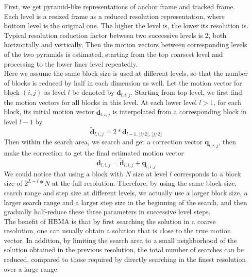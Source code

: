 \documentclass[a4paper, twocolumn]{article}
\begin{document}
	\noindent
	First, we get pyramid-like representations of anchor frame and tracked frame. Each level is a resized frame as  a reduced resolution representation, where bottom level is the original one. The higher the level is, the lower its resolution is. Typical resolution reduction factor between two successive levels is 2, both horizontally and vertically. Then the motion vectors between corresponding levels of the two pyramids is estimated, starting from the top coarsest level and processing to the lower finer level repeatedly.\\
	Here we assume the same block size is used at different levels, so that the number of blocks is reduced by half in each dimension as well. Let the motion vector for block $ (i, j) $ as level $ l $ be denoted by $ \textbf{d}_{l, i, j} $. Starting from top level, we first find the motion vectors for all blocks in this level. At each lower level $ l > 1 $, for each block, its initial motion vector $ \widetilde{\textbf{d}}_{l, i, j} $ is interpolated from a corresponding block in level $ l - 1 $ by 
	\begin{displaymath}
		\widetilde{\textbf{d}}_{l, i, j} = 2*\textbf{d}_{l-1, \lfloor i/2 \rfloor, \lfloor j/2 \rfloor}
	\end{displaymath}
	Then within the search area, we search and get a correction vector $ \textbf{q}_{l, i, j} $, then make the correction to get the final estimated motion vector
	\begin{displaymath}
		\textbf{d}_{l, i, j} = \widetilde{\textbf{d}}_{l, i, j} + \textbf{q}_{l, i, j}
	\end{displaymath}
	We could notice that using a block with $ N $ size at level $ l $ corresponds to a block size of $ 2^{L-l} * N$ at the full resolution. Therefore, by using the same block size, search range and step size at different levels, we actually use a larger block size, a larger search range and a larger step size in the beginning of the search, and then gradually half-reduce these three parameters in successive level steps.\\
	The benefit of HBMA is that by first searching the solution in a coarse resolution, one can usually obtain a solution that is close to the true motion vector. In addition, by limiting the search area to a small neighborhood of the solution obtained in the previous resolution, the total number of searches can be reduced, compared to those required by directly searching in the finest resolution over a large range.
	
	
\end{document}
